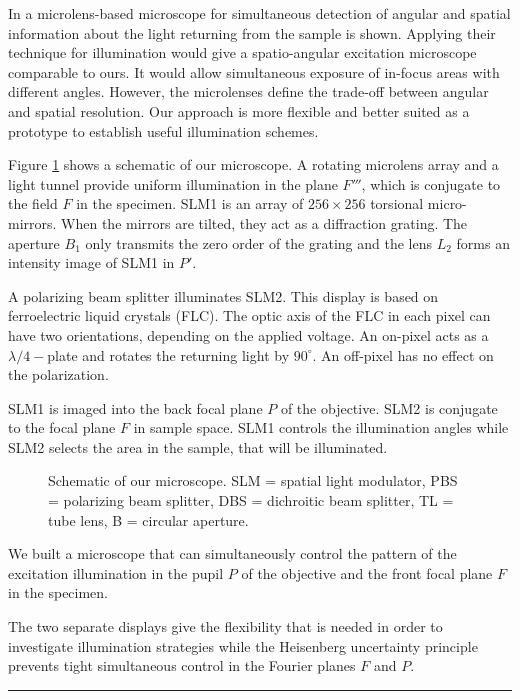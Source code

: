 \documentclass[a4paper, 11pt]{article}
\begin{document}
\begin{multicols}{2}
In \cite{Levoy2009} a microlens-based microscope for simultaneous
detection of angular and spatial information about the light returning
from the sample is shown. Applying their technique for illumination
would give a spatio-angular excitation microscope comparable to
ours. It would allow simultaneous exposure of in-focus areas with
different angles. However, the microlenses define the trade-off
between angular and spatial resolution. Our approach is more flexible
and better suited as a prototype to establish useful illumination
schemes.

 Figure \ref{fig:system}
shows a schematic of our microscope. A rotating microlens array and a
light tunnel provide uniform illumination in the plane $F'''$, which
is conjugate to the field $F$ in the specimen. SLM1 is an array of
$256\times 256$ torsional micro-mirrors. When the mirrors are tilted,
they act as a diffraction grating. The aperture $B_1$ only transmits
the zero order of the grating and the lens $L_2$ forms an intensity
image of SLM1 in $P'$.

A polarizing beam splitter illuminates SLM2. This display is based on
ferroelectric liquid crystals (FLC). The optic axis of the FLC in each
pixel can have two orientations, depending on the applied voltage. An
on-pixel acts as a $\lambda/4-$plate and rotates the returning light
by $90^\circ$. An off-pixel has no effect on the polarization.


 SLM1 is imaged into the back focal plane $P$ of the
objective. SLM2 is conjugate to the focal plane $F$ in sample space.
SLM1 controls the illumination angles while SLM2 selects the area in
the sample, that will be illuminated.

\begin{figure}[H]
{\scriptsize }
\caption{Schematic of our microscope. SLM = spatial light modulator,
  PBS = polarizing beam splitter, DBS = dichroitic beam splitter, TL =
  tube lens, B = circular aperture.}
\label{fig:system}
\end{figure}

 We built a microscope that can
simultaneously control the pattern of the excitation illumination in
the pupil $P$ of the objective and the front focal plane $F$ in the
specimen.

The two separate displays give the flexibility that is needed in order
to investigate illumination strategies while the Heisenberg
uncertainty principle prevents tight simultaneous control in the
Fourier planes $F$ and $P$.
\end{multicols}

\begin{center}
\rule{0.75\textwidth}{1pt}
\end{center}



\end{document}
